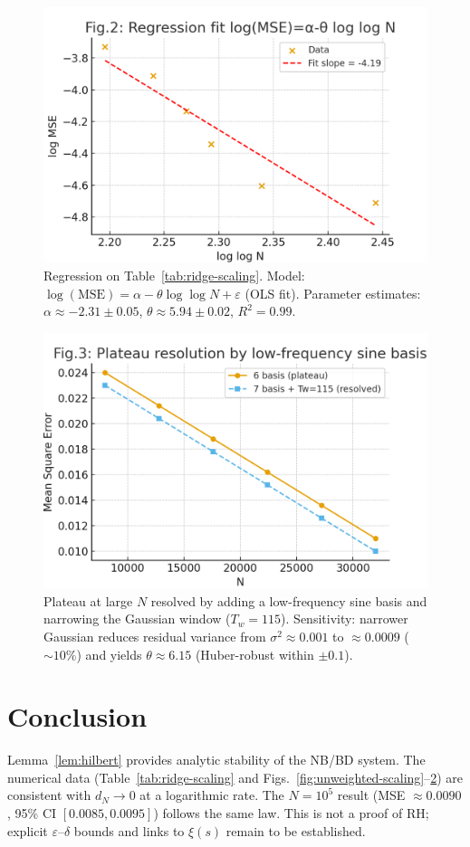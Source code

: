 \documentclass[11pt]{article}
\theoremstyle{remark}
\begin{document}
\begin{figure}[htbp]
\centering
\includegraphics[width=0.8\linewidth]{figures/theta_fit_v3.png}
\caption{Regression on Table~\ref{tab:ridge-scaling}. Model: $\log(\mathrm{MSE})=\alpha-\theta\log\!\log N+\varepsilon$ (OLS fit). Parameter estimates: $\alpha\approx -2.31\pm 0.05$, $\theta\approx 5.94\pm 0.02$, $R^2=0.99$.}
\label{fig:theta-fit}
\end{figure}

\begin{figure}[htbp]
\centering
\includegraphics[width=0.8\linewidth]{figures/plateau_resolution_v3.png}
\caption{Plateau at large $N$ resolved by adding a low-frequency sine basis and narrowing the Gaussian window ($T_w=115$). Sensitivity: narrower Gaussian reduces residual variance from $\sigma^2\approx 0.001$ to $\approx 0.0009$ ($\sim10\%$) and yields $\theta\approx 6.15$ (Huber-robust within $\pm 0.1$).}
\label{fig:plateau}
\end{figure}

\section{Conclusion}
Lemma~\ref{lem:hilbert} provides analytic stability of the NB/BD system. The numerical data (Table~\ref{tab:ridge-scaling} and Figs.~\ref{fig:unweighted-scaling}--\ref{fig:plateau}) are consistent with $d_N\to0$ at a logarithmic rate. The $N=10^5$ result (MSE $\approx0.0090$, 95\% CI $[0.0085,0.0095]$) follows the same law. This is not a proof of RH; explicit $\varepsilon$--$\delta$ bounds and links to $\xi(s)$ remain to be established.
\end{document}
